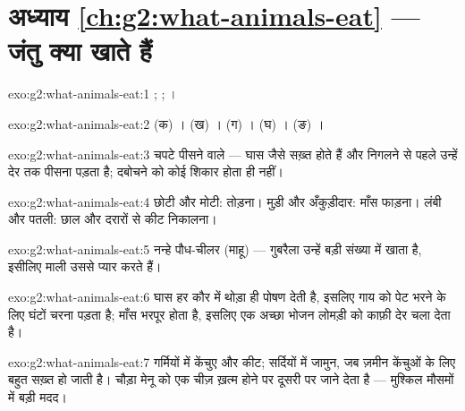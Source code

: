 \section*{अध्याय \ref{ch:g2:what-animals-eat} --- जंतु क्या खाते हैं}

\begin{solution}{exo:g2:what-animals-eat:1}
; ; ।
\end{solution}

\begin{solution}{exo:g2:what-animals-eat:2}
(क) । (ख) । (ग) । (घ) । (ङ)
।
\end{solution}

\begin{solution}{exo:g2:what-animals-eat:3}
चपटे पीसने वाले --- घास जैसे  सख़्त होते हैं और निगलने से पहले
उन्हें देर तक पीसना पड़ता है; दबोचने को कोई शिकार होता ही नहीं।
\end{solution}

\begin{solution}{exo:g2:what-animals-eat:4}
छोटी और मोटी:  तोड़ना। मुड़ी और अँकुड़ीदार: माँस फाड़ना। लंबी और
पतली: छाल और दरारों से कीट निकालना।
\end{solution}

\begin{solution}{exo:g2:what-animals-eat:5}
नन्हे पौध-चीलर (माहू) --- गुबरैला उन्हें बड़ी संख्या में खाता है,
इसीलिए माली उससे प्यार करते हैं।
\end{solution}

\begin{solution}{exo:g2:what-animals-eat:6}
घास हर कौर में थोड़ा ही पोषण देती है, इसलिए गाय को पेट भरने के लिए
घंटों चरना पड़ता है; माँस भरपूर होता है, इसलिए एक अच्छा भोजन लोमड़ी को
काफ़ी देर चला देता है।
\end{solution}

\begin{solution}{exo:g2:what-animals-eat:7}
गर्मियों में केंचुए और कीट; सर्दियों में जामुन, जब ज़मीन केंचुओं के
लिए बहुत सख़्त हो जाती है। चौड़ा मेनू  को एक चीज़ ख़त्म होने
पर दूसरी पर जाने देता है --- मुश्किल मौसमों में बड़ी मदद।
\end{solution}

